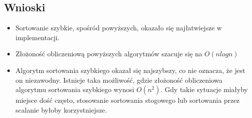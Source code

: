 \documentclass[a4paper,11pt]{article}
\begin{document}
\begin{enumerate}
\section{Wnioski}
\begin{itemize}
 \item Sortowanie szybkie, spośród powyższych, okazało się najłatwiejsze w implementacji.
 \item Złożoność obliczeniową powyższych algorytmów szacuje się na $ O(n logn) $
 \item Algorytm sortowania szybkiego okazał się najszybszy, co nie oznacza, że jest on niezawodny. Istnieje taka możliwość, gdzie złożoność obliczeniowa 
 algorytmu sortowania szybkiego wynosi $ O(n^{2}) $. Gdy takie sytuacje miałyby miejsce dość często, stosowanie sortowania stogowego lub sortowania przez scalanie byłoby korzystniejsze.
\end{itemize}


\end{enumerate}
\end{document}
